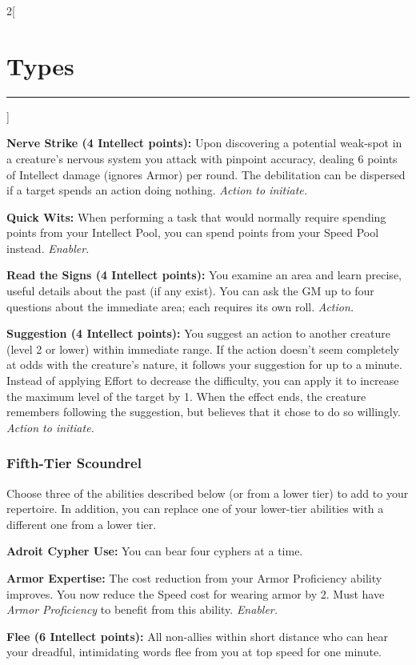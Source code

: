\documentclass[a4paper,10pt,final]{book}
\newcommand{\HRule}{\rule{\linewidth}{0.5mm}} %
\newcommand{\newSection}[1]{\section*{#1} \addcontentsline{toc}{section}{#1} \label{sec:#1} \HRule}
\newcommand{\itemAbility}[2]{\textcolor{25gray}{\textbullet\textbf{ #1:}} {#2}\par}
\newcommand{\enabler}{\textit{ Enabler.}}
\newcommand{\action}{\textit{ Action.}}
\newcommand{\actionInit}{\textit{ Action to initiate.}}
\newenvironment{docsection}[1]
{
  \begin{multicols*}{2}[\newSection{#1}]
}
{
  \end{multicols*}
  \newpage
}
\begin{document}
\begin{docsection}{Types}
\itemAbility{Nerve Strike (4 Intellect points)}{Upon 
discovering a potential weak-spot in a creature's nervous system you
attack with pinpoint accuracy, dealing 6 points of Intellect
damage (ignores Armor) per round. The
debilitation can be dispersed if a target
spends an action doing nothing.\actionInit}

\itemAbility{Quick Wits}{When performing a task that
would normally require spending points from
your Intellect Pool, you can spend points
from your Speed Pool instead.\enabler}

\itemAbility{Read the Signs (4 Intellect points)}{You
examine an area and learn precise, useful
details about the past (if any exist). You can
ask the GM up to four questions about the
immediate area; each requires its own roll.
\action}

\itemAbility{Suggestion (4 Intellect points)}{You
suggest an action to another creature (level
2 or lower) within immediate range. If the
action doesn’t seem completely at odds
with the creature’s nature, it follows your
suggestion for up to a minute. Instead of
applying Effort to decrease the difficulty,
you can apply it to increase the maximum
level of the target by 1. When the effect
ends, the creature remembers following the
suggestion, but believes that it chose to do
so willingly. \actionInit}


\subsubsection*{Fifth-Tier Scoundrel}
\label{subsub:scoundrelFifthTier}

Choose three of the abilities described
below (or from a lower tier) to add to your
repertoire. In addition, you can replace one
of your lower-tier abilities with a different
one from a lower tier. \par

\itemAbility{Adroit Cypher Use}{You can bear four
cyphers at a time.}

\itemAbility{Armor Expertise}{The cost reduction from your Armor Proficiency ability improves. You now reduce the Speed cost for wearing armor by 2. Must have \textit{Armor Proficiency} to benefit from this ability.\enabler}

\itemAbility{Flee (6 Intellect points)}{All non-allies
within short distance who can hear your
dreadful, intimidating words flee from you
at top speed for one minute.}


\end{docsection}
\end{document}
